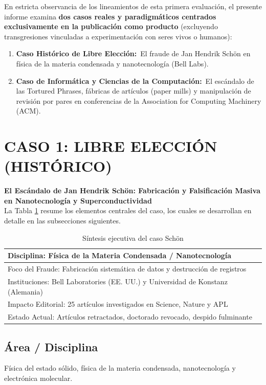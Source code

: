 \documentclass[12pt,a4paper]{article}
\newcommand{\itemlabel}[3]{\textbf{#1#2}~#3}
\let\oldsection\section
\renewcommand{\section}[1]{\needspace{5\baselineskip}\oldsection{#1}}
\begin{document}
En estricta observancia de los lineamientos de esta primera evaluación, el presente informe examina \textbf{dos casos reales y paradigmáticos centrados exclusivamente en la publicación como producto} (excluyendo transgresiones vinculadas a experimentación con seres vivos o humanos):
\begin{enumerate}
\item \itemlabel{Caso Histórico de Libre Elección}{:}{El fraude de Jan Hendrik Schön en física de la materia condensada y nanotecnología (Bell Labs).}
\item \itemlabel{Caso de Informática y Ciencias de la Computación}{:}{El escándalo de las \textquotedbl{}Tortured Phrases\textquotedbl{}, fábricas de artículos (paper mills) y manipulación de revisión por pares en conferencias de la Association for Computing Machinery (ACM).}
\end{enumerate}
\section{CASO 1: LIBRE ELECCIÓN (HISTÓRICO)}
\textbf{\textquotedbl{}El Escándalo de Jan Hendrik Schön: Fabricación y Falsificación Masiva en Nanotecnología y Superconductividad\textquotedbl{}}\\
La Tabla \ref{tab:sintesis-schon} resume los elementos centrales del caso, los cuales se desarrollan en detalle en las subsecciones siguientes.
\begin{table}[htbp]
\centering
\caption{Síntesis ejecutiva del caso Schön}
\label{tab:sintesis-schon}
\begin{tabularx}{\linewidth}{X}
\toprule
Disciplina: Física de la Materia Condensada / Nanotecnología \\
\midrule
Foco del Fraude: Fabricación sistemática de datos y destrucción de registros \\
Instituciones: Bell Laboratories (EE. UU.) y Universidad de Konstanz (Alemania) \\
Impacto Editorial: 25 artículos investigados en Science, Nature y APL \\
Estado Actual: Artículos retractados, doctorado revocado, despido fulminante \\
\bottomrule
\end{tabularx}
\end{table}
\subsection{Área / Disciplina}
Física del estado sólido, física de la materia condensada, nanotecnología y electrónica molecular.
\end{document}
